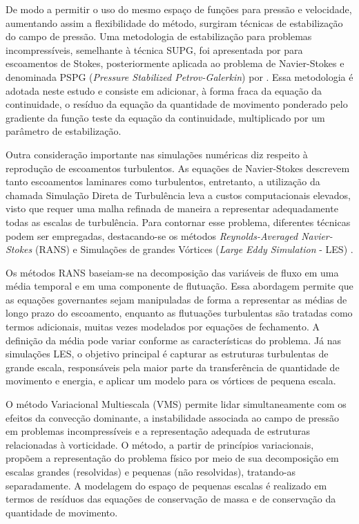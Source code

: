 \documentclass[tese_patricia.tex]{subfiles}
\begin{document}
De modo a permitir o uso do mesmo espaço de funções para pressão e velocidade, aumentando assim a flexibilidade do método, surgiram técnicas de estabilização do campo de pressão. Uma metodologia de estabilização para problemas incompressíveis, semelhante à técnica SUPG, foi apresentada por  para escoamentos de Stokes, posteriormente aplicada ao problema de Navier-Stokes e denominada PSPG (\textit{Pressure Stabilized Petrov-Galerkin}) por . Essa metodologia é adotada neste estudo e consiste em adicionar, à forma fraca da equação da continuidade, o resíduo da equação da quantidade de movimento ponderado pelo gradiente da função teste da equação da continuidade, multiplicado por um parâmetro de estabilização.

Outra consideração importante nas simulações numéricas diz respeito à reprodução de escoamentos turbulentos. As equações de Navier-Stokes descrevem tanto escoamentos laminares como turbulentos, entretanto, a utilização da chamada Simulação Direta de Turbulência leva a custos computacionais elevados, visto que requer uma malha refinada de maneira a representar adequadamente todas as escalas de turbulência. Para contornar esse problema, diferentes técnicas podem ser empregadas, destacando-se os métodos \textit{Reynolds-Averaged Navier-Stokes} (RANS) \cite{Speziale1991,Alfonsi2009} e Simulações de grandes Vórtices (\textit{Large Eddy Simulation} - LES) \cite{LaunderS:1972,Germano1991,Wilcox:1993,PIOMELLI1999}.

Os métodos RANS baseiam-se na decomposição das variáveis de fluxo em uma média temporal e em uma componente de flutuação. Essa abordagem permite que as equações governantes sejam manipuladas de forma a representar as médias de longo prazo do escoamento, enquanto as flutuações turbulentas são tratadas como termos adicionais, muitas vezes modelados por equações de fechamento. A definição da média pode variar conforme as características do problema. Já nas simulações LES, o objetivo principal é capturar as estruturas turbulentas de grande escala, responsáveis pela maior parte da transferência de quantidade de movimento e energia, e aplicar um modelo para os vórtices de pequena escala.

O método Variacional Multiescala (VMS) \cite{Hughes:1995,Hughesetal:1998,Hughesetal:2001,BazilevsTT:2013} permite lidar simultaneamente com os efeitos da convecção dominante, a instabilidade associada ao campo de pressão em problemas incompressíveis e a representação adequada de estruturas relacionadas à vorticidade. O método, a partir de princípios variacionais, propõem a representação do problema físico por meio de sua decomposição em escalas grandes (resolvidas) e pequenas (não resolvidas), tratando-as separadamente.  A modelagem do espaço de pequenas escalas é realizado em termos de resíduos das equações de conservação de massa e de conservação da quantidade de movimento. 
\end{document}
